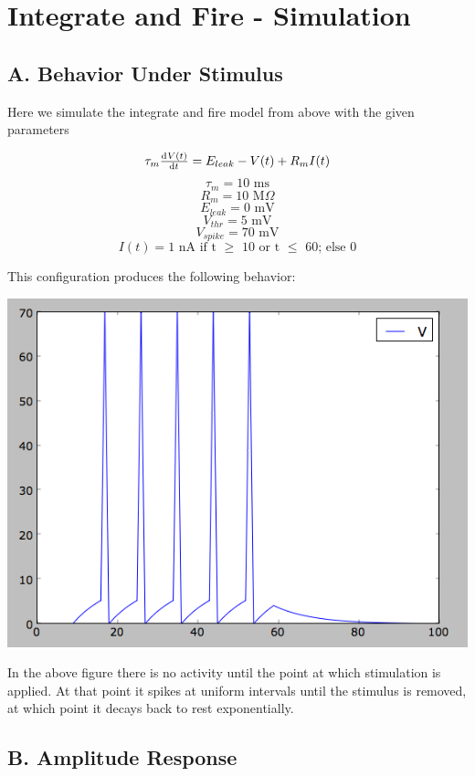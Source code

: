 \documentclass[12pt]{article}
\begin{document}
\section{Integrate and Fire - Simulation}

\subsection{A. Behavior Under Stimulus}

Here we simulate the integrate and fire model from above with the given parameters

$$ \tau_m\od{V(t)}{t}=E_{leak}-V(t)+R_mI(t) $$
$$ \tau_m=10 \text{ ms} $$
$$ R_m=10 \text{ M}\Omega $$
$$ E_{leak}=0 \text{ mV} $$
$$ V_{thr}=5 \text{ mV} $$
$$ V_{spike}=70 \text{ mV} $$
$$ I(t)=1 \text{ nA if t $\ge$ 10 or t $\le$ 60; else 0} $$

This configuration produces the following behavior:

\vspace{15pt}
\includegraphics[scale=0.71]{integratefirespikes.png}
\vspace{5pt}

In the above figure there is no activity until the point at which stimulation is applied.  At that point it spikes at uniform intervals until the stimulus is removed, at which point it decays back to rest exponentially.  

\subsection{B. Amplitude Response}
\end{document}
